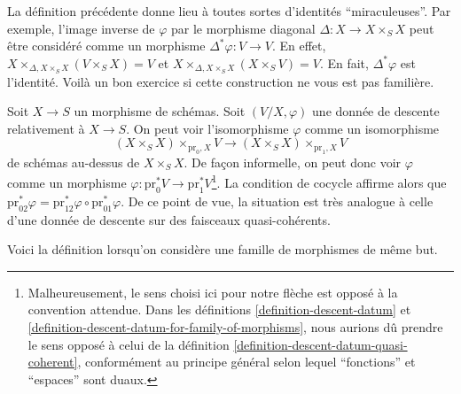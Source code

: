 \noindent
La définition précédente donne lieu à toutes sortes d'identités
``miraculeuses''. Par exemple, l'image inverse de $\varphi$ par le
morphisme diagonal $\Delta : X \to X \times_S X$ peut être considéré comme
un morphisme $\Delta^*\varphi : V \to V$.
En effet, $X \times_{\Delta, X \times_S X} (V \times_S X) = V$ et
$X \times_{\Delta, X \times_S X} (X \times_S V) = V$.
En fait, $\Delta^*\varphi$ est l'identité.
Voilà un bon exercice si cette construction ne vous est pas familière.

\begin{remark}
\label{remark-easier}
Soit $X \to S$ un morphisme de schémas. Soit $(V/X, \varphi)$ une donnée
de descente relativement à $X \to S$. On peut voir l'isomorphisme
$\varphi$ comme un isomorphisme
$$
(X \times_S X) \times_{\text{pr}_0, X} V
\longrightarrow
(X \times_S X) \times_{\text{pr}_1, X} V
$$
de schémas au-dessus de $X \times_S X$. De façon informelle, on peut donc
voir $\varphi$ comme un morphisme
$\varphi : \text{pr}_0^*V \to \text{pr}_1^*V$\footnote{Malheureusement,
le sens choisi ici pour notre flèche est opposé à la convention attendue. Dans les
définitions \ref{definition-descent-datum} et
\ref{definition-descent-datum-for-family-of-morphisms}, nous aurions dû
prendre le sens opposé à celui de la
définition \ref{definition-descent-datum-quasi-coherent}, conformément au
principe général selon lequel ``fonctions'' et ``espaces'' sont
duaux.}. La condition de cocycle affirme alors que
$\text{pr}_{02}^*\varphi =
\text{pr}_{12}^*\varphi \circ \text{pr}_{01}^*\varphi$.
De ce point de vue, la situation est très analogue à celle d'une donnée de
descente sur des faisceaux quasi-cohérents.
\end{remark}

\noindent
Voici la définition lorsqu'on considère une famille de morphismes de même but.

